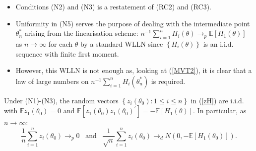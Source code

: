 \documentclass[notes=show]{beamer}
\begin{document}
\begin{frame}%


\begin{itemize}
\item Conditions (N2) and (N3) is a restatement of (RC2) and (RC3).

\item Uniformity in (N5) serves the purpose of dealing with the intermediate
point $\theta _{n}^{\ast }$ arising from the linearisation scheme: $%
n^{-1}\sum_{i=1}^{n}H_{i}\left( \theta \right) \rightarrow _{p}\mathbb{E}%
\left[ H_{1}\left( \theta \right) \right] $ as $n\rightarrow \infty $ for
each $\theta $ by a standard WLLN since $\left\{ H_{i}\left( \theta \right)
\right\} $ is an i.i.d. sequence with finite first moment.

\item However, this WLLN is not enough as, looking at (\ref{MVT2}), it is
clear that a law of large numbers on $n^{-1}\sum_{i=1}^{n}H_{i}\left( \theta
_{n}^{\ast }\right) $ is required.
\end{itemize}

\end{frame}%

\begin{frame}%


\begin{lemma}
Under (N1)-(N3), the random vectors $\left\{ z_{i}\left( \theta _{0}\right)
:1\leq i\leq n\right\} $ in (\ref{zH}) are i.i.d. with $\mathbb{E}%
z_{1}\left( \theta _{0}\right) =0$ and $\mathbb{E}\left[ z_{1}\left( \theta
_{0}\right) z_{1}\left( \theta _{0}\right) ^{\prime }\right] =-\mathbb{E}%
\left[ H_{1}\left( \theta \right) \right] $. In particular, as $n\rightarrow
\infty $:%
\begin{equation}
\frac{1}{n}\sum_{i=1}^{n}z_{i}\left( \theta _{0}\right) \rightarrow
_{p}0\;\;\;\text{and}\;\;\;\frac{1}{\sqrt{n}}\sum_{i=1}^{n}z_{i}\left(
\theta _{0}\right) \rightarrow _{d}N\left( 0,-\mathbb{E}\left[ H_{1}\left(
\theta _{0}\right) \right] \right) .  \label{limZ}
\end{equation}
\end{lemma}

\end{frame}%
\end{document}
